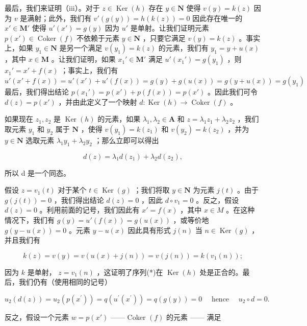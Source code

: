 最后，我们来证明（iii）。对于 \(z \in \operatorname{Ker}(h)\) 存在 \(y \in \mathbf{N}\) 使得 \(v(y) = k(z)\) 因为 \(v\) 是满射；此外，我们有 \(v'(g(y)) = h(k(z)) = 0\) 因此存在唯一的 \(x' \in \mathbf{M}'\) 使得 \(u'(x') = g(y)\) 因为 \(u'\) 是单射。让我们证明元素 \(p(x') \in \operatorname{Coker}(f)\) 不依赖于元素 \(y \in \mathbf{N}\) ，只要它满足 \(v(y) = k(z)\) 。事实上，如果 \(y_1 \in \mathbf{N}\) 是另一个满足 \(v(y_1) = k(z)\) 的元素，我们有 \(y_1 = y + u(x)\) ，其中 \(x \in \mathbf{M}\) 。让我们证明，如果 \(x_1' \in \mathbf{M}'\) 满足 \(u'(x_1') = g(y_1)\) ，则 \(x_1' = x' + f(x)\) ；事实上，我们有 \(u'(x' + f(x)) = u'(x') + u'(f(x)) = g(y) + g(u(x)) = g(y + u(x)) = g(y_1)\) 最后，我们得出结论 \(p(x_1') = p(x') + p(f(x)) = p(x')\) 。因此我们可令 \(d(z) = p(x')\) ，并由此定义了一个映射 \(d: \operatorname{Ker}(h) \to \operatorname{Coker}(f)\) 。

如果现在 \(z_{1}, z_{2}\) 是 \(\operatorname{Ker}(h)\) 的元素，如果 \(\lambda_{1}, \lambda_{2} \in \mathbf{A}\) 和 \(z = \lambda_{1} z_{1} + \lambda_{2} z_{2}\) ，我们取元素 \(y_{1}\) 和 \(y_{2}\) 属于 \(\mathbf{N}\) ，使得 \(v(y_{1}) = k(z_{1})\) 和 \(v(y_{2}) = k(z_{2})\) ，并为 \(y \in \mathbf{N}\) 选取元素 \(\lambda_{1} y_{1} + \lambda_{2} y_{2}\) ；那么立即可以得出

\[
d (z) = \lambda_ {1} d (z _ {1}) + \lambda_ {2} d (z _ {2}),
\]

所以 d 是一个同态。

假设 \(z = v_1(t)\) 对于某个 \(t \in \operatorname{Ker}(g)\) ；我们将取 \(y \in \mathbf{N}\) 为元素 \(j(t)\) 。由于 \(g(j(t)) = 0\) ，我们得出结论 \(d(z) = 0\) ，因此 \(d \circ v_1 = 0\) 。反之，假设 \(d(z) = 0\) 。利用前面的记号，我们因此有 \(x' = f(x)\) ，其中 \(x \in M\) 。在这种情况下，我们有 \(g(y) = u'(f(x)) = g(u(x))\) ，或等价地 \(g(y - u(x)) = 0\) 。元素 \(y - u(x)\) 因此具有形式 \(j(n)\) 当 \(n \in \operatorname{Ker}(g)\) ，并且我们有

\[
k (z) = v (y) = v (u (x) + j (n)) = v (j (n)) = k \left(v _ {1} (n)\right);
\]

因为 \(k\) 是单射， \(z = v_{1}(n)\) ，这证明了序列(*)在 \(\operatorname{Ker}(h)\) 处是正合的。最后，我们仍有（使用相同的记号）

\[
u _ {2} (d (z)) = u _ {2} \left(p \left(x ^ {\prime}\right)\right) = q \left(u ^ {\prime} \left(x ^ {\prime}\right)\right) = q (g (y)) = 0 \quad \text {   hence   } \quad u _ {2} \circ d = 0.
\]

反之，假设一个元素 \(w = p(x')\) —— Coker \((f)\) 的元素 —— 满足

